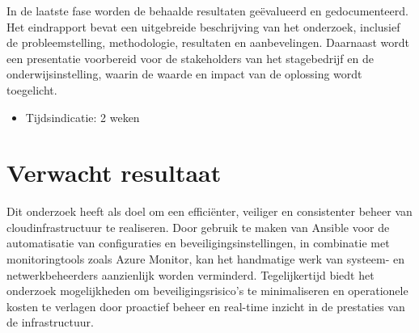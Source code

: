 In de laatste fase worden de behaalde resultaten geëvalueerd en gedocumenteerd. Het eindrapport bevat een uitgebreide beschrijving van het onderzoek, inclusief de probleemstelling, methodologie, resultaten en aanbevelingen.
Daarnaast wordt een presentatie voorbereid voor de stakeholders van het stagebedrijf en de onderwijsinstelling, waarin de waarde en impact van de oplossing wordt toegelicht.

\begin{itemize}
  \item Tijdsindicatie: 2 weken
\end{itemize}

\section{Verwacht resultaat}%
\label{sec:verwachte_resultaten}

Dit onderzoek heeft als doel om een efficiënter, veiliger en consistenter beheer van cloudinfrastructuur te realiseren.
Door gebruik te maken van Ansible voor de automatisatie van configuraties en beveiligingsinstellingen, in combinatie met monitoringtools zoals Azure Monitor, kan het handmatige werk van systeem- en netwerkbeheerders aanzienlijk worden verminderd.
Tegelijkertijd biedt het onderzoek mogelijkheden om beveiligingsrisico's te minimaliseren en operationele kosten te verlagen door proactief beheer en real-time inzicht in de prestaties van de infrastructuur.
